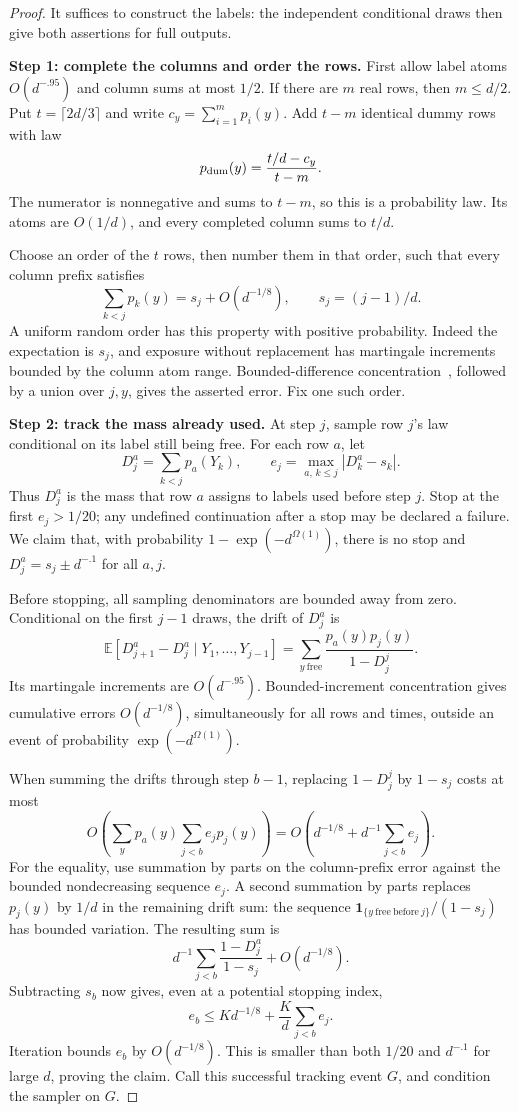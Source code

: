 \begin{proof}
It suffices to construct the labels: the independent conditional draws
then give both assertions for full outputs.

\noindent\textbf{Step 1: complete the columns and order the rows.}\quad
First allow label atoms \(O(d^{-.95})\) and column sums at most \(1/2\).
If there are \(m\) real rows, then \(m\le d/2\). Put
\(t=\lceil2d/3\rceil\) and write \(c_y=\sum_{i=1}^m p_i(y)\).
Add \(t-m\) identical dummy rows with law
\[
 p_{\rm dum}(y)=\frac{t/d-c_y}{t-m}.
\]
The numerator is nonnegative and sums to \(t-m\), so this is a probability
law. Its atoms are \(O(1/d)\), and every completed column sums to \(t/d\).

Choose an order of the \(t\) rows, then number them in that order, such
that every column prefix satisfies
\[
 \sum_{k<j}p_k(y)=s_j+O(d^{-1/8}),\qquad s_j=(j-1)/d.
\]
A uniform random order has this property with positive probability.
Indeed the expectation is \(s_j\), and exposure without replacement has
martingale increments bounded by the column atom range. Bounded-difference
concentration~\cite{hoeffding1963,azuma1967}, followed by a union over
\(j,y\), gives the asserted error. Fix one such order.

\noindent\textbf{Step 2: track the mass already used.}\quad
At step \(j\), sample row \(j\)'s law conditional on its label still
being free. For each row \(a\), let
\[
 D_j^a=\sum_{k<j}p_a(Y_k),\qquad
 e_j=\max_{a,\,k\le j}|D_k^a-s_k|.
\]
Thus \(D_j^a\) is the mass that row \(a\) assigns to labels used before
step \(j\). Stop at the first \(e_j>1/20\); any undefined continuation
after a stop may be declared a failure. We claim that, with probability
\(1-\exp(-d^{\Omega(1)})\), there is no stop and
\(D_j^a=s_j\pm d^{-.1}\) for all \(a,j\).

Before stopping, all sampling denominators are bounded away from zero.
Conditional on the first \(j-1\) draws, the drift of \(D_j^a\) is
\[
 \mathbb E[D_{j+1}^a-D_j^a\mid Y_1,\ldots,Y_{j-1}]
  =\sum_{y\ \mathrm{free}}\frac{p_a(y)p_j(y)}{1-D_j^j}.
\]
Its martingale increments are \(O(d^{-.95})\). Bounded-increment
concentration gives cumulative errors \(O(d^{-1/8})\), simultaneously
for all rows and times, outside an event of probability
\(\exp(-d^{\Omega(1)})\).

When summing the drifts through step \(b-1\), replacing \(1-D_j^j\) by
\(1-s_j\) costs at most
\[
 O\left(\sum_y p_a(y)\sum_{j<b}e_jp_j(y)\right)
   =O\left(d^{-1/8}+d^{-1}\sum_{j<b}e_j\right).
\]
For the equality, use summation by parts on the column-prefix error
against the bounded nondecreasing sequence \(e_j\). A second summation
by parts replaces \(p_j(y)\) by \(1/d\) in the remaining drift sum:
the sequence \(\mathbf1_{\{y\ \mathrm{free\ before}\ j\}}/(1-s_j)\)
has bounded variation. The resulting sum is
\[
 d^{-1}\sum_{j<b}\frac{1-D_j^a}{1-s_j}+O(d^{-1/8}).
\]
Subtracting \(s_b\) now gives, even at a potential stopping index,
\[
 e_b\le Kd^{-1/8}+\frac Kd\sum_{j<b}e_j.
\]
Iteration bounds \(e_b\) by \(O(d^{-1/8})\). This is smaller than both
\(1/20\) and \(d^{-.1}\) for large \(d\), proving the claim. Call this
successful tracking event \(G\), and condition the sampler on \(G\).


\end{proof}
